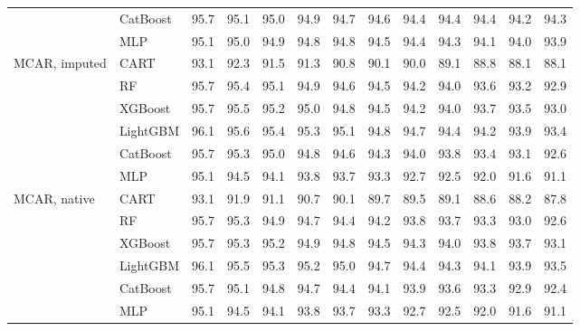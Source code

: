 \begin{table}[p]
\begin{tabular}{@{}llrrrrrrrrrrr@{}}
 & CatBoost & 95.7 & 95.1 & 95.0 & 94.9 & 94.7 & 94.6 & 94.4 & 94.4 & 94.4 & 94.2 & 94.3 \\
 & MLP & 95.1 & 95.0 & 94.9 & 94.8 & 94.8 & 94.5 & 94.4 & 94.3 & 94.1 & 94.0 & 93.9 \\
\midrule
MCAR, imputed & CART & 93.1 & 92.3 & 91.5 & 91.3 & 90.8 & 90.1 & 90.0 & 89.1 & 88.8 & 88.1 & 88.1 \\
 & RF & 95.7 & 95.4 & 95.1 & 94.9 & 94.6 & 94.5 & 94.2 & 94.0 & 93.6 & 93.2 & 92.9 \\
 & XGBoost & 95.7 & 95.5 & 95.2 & 95.0 & 94.8 & 94.5 & 94.2 & 94.0 & 93.7 & 93.5 & 93.0 \\
 & LightGBM & 96.1 & 95.6 & 95.4 & 95.3 & 95.1 & 94.8 & 94.7 & 94.4 & 94.2 & 93.9 & 93.4 \\
 & CatBoost & 95.7 & 95.3 & 95.0 & 94.8 & 94.6 & 94.3 & 94.0 & 93.8 & 93.4 & 93.1 & 92.6 \\
 & MLP & 95.1 & 94.5 & 94.1 & 93.8 & 93.7 & 93.3 & 92.7 & 92.5 & 92.0 & 91.6 & 91.1 \\
\midrule
MCAR, native & CART & 93.1 & 91.9 & 91.1 & 90.7 & 90.1 & 89.7 & 89.5 & 89.1 & 88.6 & 88.2 & 87.8 \\
 & RF & 95.7 & 95.3 & 94.9 & 94.7 & 94.4 & 94.2 & 93.8 & 93.7 & 93.3 & 93.0 & 92.6 \\
 & XGBoost & 95.7 & 95.3 & 95.2 & 94.9 & 94.8 & 94.5 & 94.3 & 94.0 & 93.8 & 93.7 & 93.1 \\
 & LightGBM & 96.1 & 95.5 & 95.3 & 95.2 & 95.0 & 94.7 & 94.4 & 94.3 & 94.1 & 93.9 & 93.5 \\
 & CatBoost & 95.7 & 95.1 & 94.8 & 94.7 & 94.4 & 94.1 & 93.9 & 93.6 & 93.3 & 92.9 & 92.4 \\
 & MLP & 95.1 & 94.5 & 94.1 & 93.8 & 93.7 & 93.3 & 92.7 & 92.5 & 92.0 & 91.6 & 91.1 \\
\bottomrule
\end{tabular}
\end{table}

